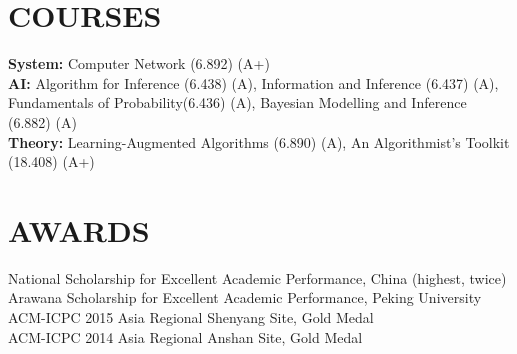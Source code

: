 \documentclass[margin]{res}
\newcommand{\Bullet}[1]{{\raisebox{0.25ex}{\tiny$\bullet$\ }}{#1}\\}
\begin{document}
\begin{resume}
\section{COURSES}
\textbf{System:} Computer Network (6.892) (A+) \\
\textbf{AI:} Algorithm for Inference (6.438) (A), Information and Inference (6.437) (A), Fundamentals of Probability(6.436) (A), Bayesian Modelling and Inference (6.882) (A) \\
\textbf{Theory:} Learning-Augmented Algorithms (6.890) (A), An Algorithmist's Toolkit (18.408) (A+)\\

\section{AWARDS}
    \Bullet{National Scholarship for Excellent Academic Performance, China (highest, twice)}
    \Bullet{Arawana Scholarship for Excellent Academic Performance, Peking University}
    \Bullet{ACM-ICPC 2015 Asia Regional Shenyang Site, Gold Medal}
    \Bullet{ACM-ICPC 2014 Asia Regional Anshan Site, Gold Medal}

%
%
%


\end{resume}
\end{document}
